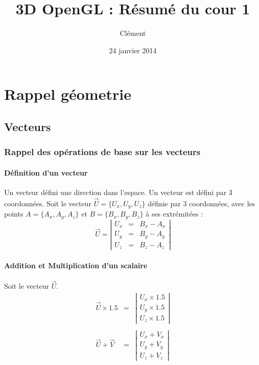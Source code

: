 \documentclass{report}
\title{3D OpenGL : Résumé du cour 1}
\author{Clément \bsc{Barbaste}}
\date{24 janvier 2014}
\begin{document}
\maketitle
\part{Rappel géometrie}
\chapter{Vecteurs}
\section{Rappel des opérations de base sur les vecteurs}
\subsection{Définition d'un vecteur}
Un vecteur défini une direction dans l'espace. Un vecteur est défini par 3 coordonnées. Soit le vecteur $\vec{U} = \{U_x, U_y, U_z\}$ définie par 3 coordonnées, avec les points $A = \{A_x, A_y, A_z\}$ et $B = \{B_x, B_y, B_z\}$ à ses extrémitées :
\[
\vec{U} = 
\left|
\begin{array}{rcl}
  U_x &=& B_x - A_x\\
  U_y &=& B_y - A_y\\
  U_z &=& B_z - A_z
\end{array}
\right|
\]
\subsection{Addition et Multiplication d'un scalaire}
Soit le vecteur $\vec{U}$.
\[
\begin{array}{rcl}
\vec{U}\times1.5 &=& 
\left|
\begin{array}{c}
	U_x\times1.5\\
	U_y\times1.5\\
	U_z\times1.5
\end{array}
\right|\\\\
\vec{U} + \vec{V} &=&
\left|
\begin{array}{c}
	U_x+V_x\\
	U_y+V_y\\
	U_z+V_z
\end{array}
\right|
\end{array}
\]
\end{document}
